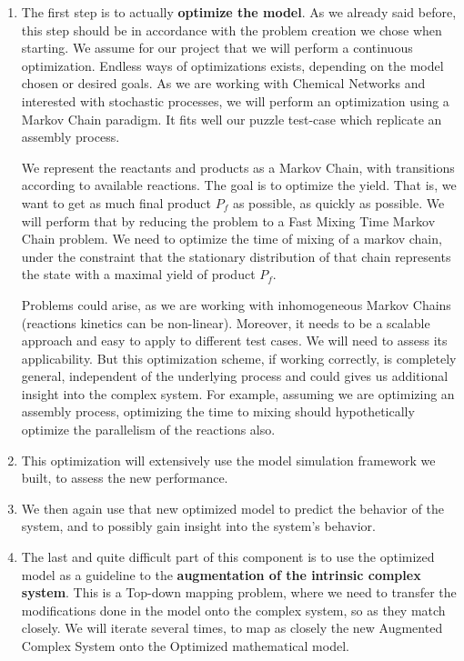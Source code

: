 \documentclass[letterpaper, oneside]{article}
\begin{document}
\begin{enumerate}
	\item The first step is to actually \textbf{optimize the model}. As we already said before, this step should be in accordance with the problem creation we chose when starting. We assume for our project that we will perform a continuous optimization. Endless ways of optimizations exists, depending on the model chosen or desired goals. As we are working with Chemical Networks and interested with stochastic processes, we will perform an optimization using a Markov Chain paradigm. It fits well our puzzle test-case which replicate an assembly process.
	
	We represent the reactants and products as a Markov Chain, with transitions according to available reactions. The goal is to optimize the yield. That is, we want to get as much final product $P_f$ as possible, as quickly as possible. We will perform that by reducing the problem to a Fast Mixing Time Markov Chain problem. We need to optimize the time of mixing of a markov chain, under the constraint that the stationary distribution of that chain represents the state with a maximal yield of product $P_f$.
	
	Problems could arise, as we are working with inhomogeneous Markov Chains (reactions kinetics can be non-linear). Moreover, it needs to be a scalable approach and easy to apply to different test cases. We will need to assess its applicability. But this optimization scheme, if working correctly, is completely general, independent of the underlying process and could gives us additional insight into the complex system. For example, assuming we are optimizing an assembly process, optimizing the time to mixing should hypothetically optimize the parallelism of the reactions also.
	\item This optimization will extensively use the model simulation framework we built, to assess the new performance.
	\item We then again use that new optimized model to predict the behavior of the system, and to possibly gain insight into the system's behavior.
	\item The last and quite difficult part of this component is to use the optimized model as a guideline to the \textbf{augmentation of the intrinsic complex system}. This is a Top-down mapping problem, where we need to transfer the modifications done in the model onto the complex system, so as they match closely. We will iterate several times, to map as closely the new Augmented Complex System onto the Optimized mathematical model.
\end{enumerate}
\end{document}
